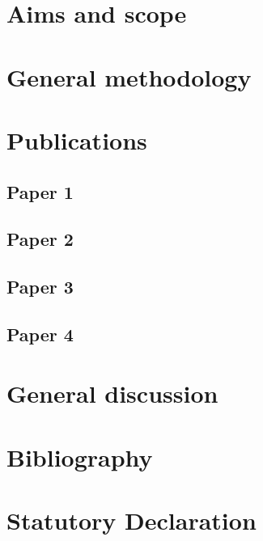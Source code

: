 \documentclass[11pt]{report}
\begin{document}
    \chapter{Aims and scope}

    \chapter{General methodology}

    \chapter{Publications}
        \section{Paper 1}
        
        \section{Paper 2}

        \section{Paper 3}

        \section{Paper 4}

    \chapter{General discussion}

    \chapter{Bibliography}

    \chapter{Statutory Declaration}
\end{document}
